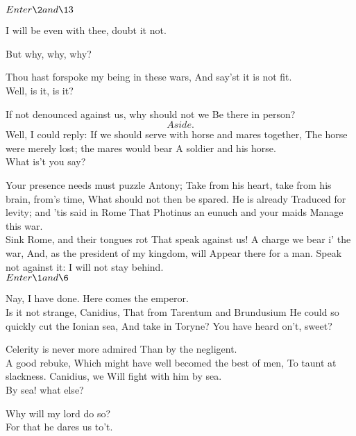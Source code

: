 \documentclass{book}
\begin{document}


	\(Enter \2 and \13\)

\2	I will be even with thee, doubt it not.

	But why, why, why?

\2	Thou hast forspoke my being in these wars,
	And say'st it is not fit. \\

	Well, is it, is it?

\2	If not denounced against us, why should not we
	Be there in person? \\

	\[Aside.\]  Well, I could reply:
	If we should serve with horse and mares together,
	The horse were merely lost; the mares would bear
	A soldier and his horse. \\

\2	What is't you say?

	Your presence needs must puzzle Antony;
	Take from his heart, take from his brain, from's time,
	What should not then be spared. He is already
	Traduced for levity; and 'tis said in Rome
	That Photinus an eunuch and your maids
	Manage this war. \\

\2	                  Sink Rome, and their tongues rot
	That speak against us! A charge we bear i' the war,
	And, as the president of my kingdom, will
	Appear there for a man. Speak not against it:
	I will not stay behind. \\


	\(Enter \1 and \6\)

	Nay, I have done.
	Here comes the emperor. \\


\1	Is it not strange, Canidius,
	That from Tarentum and Brundusium
	He could so quickly cut the Ionian sea,
	And take in Toryne? You have heard on't, sweet?

\2	Celerity is never more admired
	Than by the negligent. \\

\1	A good rebuke,
	Which might have well becomed the best of men,
	To taunt at slackness. Canidius, we
	Will fight with him by sea. \\

\2	By sea! what else?

\6	Why will my lord do so? \\

\1	For that he dares us to't.
\end{document}
